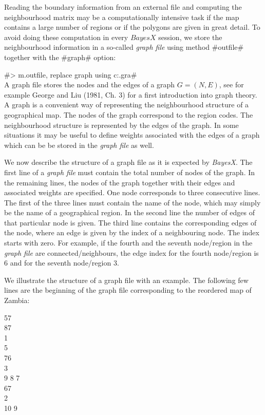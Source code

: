 \documentclass{article}
\begin{document}
Reading the boundary information from an external file and
computing the neighbourhood matrix may be a computationally
intensive task if the map contains a large number of regions or if
the polygons are given in great detail. To avoid doing these
computation in every $BayesX$ session, we store the neighbourhood
information in a so-called {\it graph file} using method #outfile#
together with the #graph# option:

#> m.outfile, replace graph using c:\data\zambiasort.gra#\\

A graph file stores the nodes and the edges of a graph $G =
(N,E)$, see for example George and Liu (1981, Ch. 3) for a first
introduction into graph theory. A graph is a convenient way of
representing the neighbourhood structure of a geographical map.
The nodes of the graph correspond to the region codes. The
neighbourhood structure is represented by the edges of the graph.
In some situations it may be useful to define weights associated
with the edges of a graph which can be be stored in the {\em graph
file} as well.

We now describe the structure of a graph file as it is expected by
{\em BayesX}. The first line of a {\em graph file} must contain
the total number of nodes of the graph. In the remaining lines,
the nodes of the graph together with their edges and associated
weights are specified. One node corresponds to three consecutive
lines. The first of the three lines must contain the name of the
node, which may simply be the name of a geographical region. In
the second line the number of edges of that particular node is
given. The third line contains the corresponding edges of the
node, where an edge is given by the index of a neighbouring node.
The index starts with zero. For example, if the fourth and the
seventh node/region in the {\em graph file} are
connected/neighbours, the edge index for the fourth node/region is
6 and for the seventh node/region 3.

We illustrate the structure of a graph file with an example. The
following few lines are the beginning
of the graph file corresponding to the reordered map of Zambia: \\

\footnotesize

 57\\
 87\\
 1\\
 5\\
 76\\
 3\\
 9 8 7\\
 67\\
 2\\
 10 9\\
\end{document}

